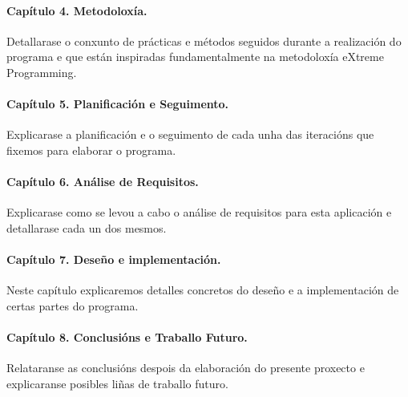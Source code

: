 \paragraph*{Capítulo 4. Metodoloxía.}
Detallarase o conxunto de prácticas e métodos seguidos durante a realización do programa e que están inspiradas fundamentalmente na metodoloxía eXtreme Programming.
\paragraph*{Capítulo 5. Planificación e Seguimento.}
Explicarase a planificación e o seguimento de cada unha das iteracións que fixemos para elaborar o programa.

\paragraph*{Capítulo 6. Análise de Requisitos.}
Explicarase como se levou a cabo o análise de requisitos para esta aplicación e detallarase cada un dos mesmos.

\paragraph*{Capítulo 7. Deseño e implementación.}
Neste capítulo explicaremos detalles concretos do deseño e a implementación de certas partes do programa.

\paragraph*{Capítulo 8. Conclusións e Traballo Futuro.}
Relataranse as conclusións despois da elaboración do presente proxecto e explicaranse posibles liñas de traballo futuro.





